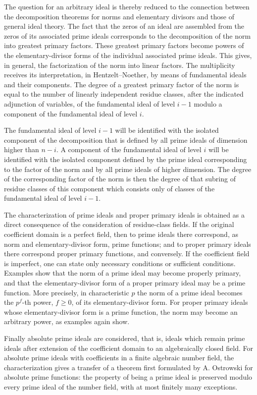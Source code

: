 \documentclass[11pt]{article}
\begin{document}
The question for an arbitrary ideal is thereby reduced to the connection between the decomposition theorems for norms and elementary divisors and those of general ideal theory. The fact that the zeros of an ideal are assembled from the zeros of its associated prime ideals corresponds to the decomposition of the norm into greatest primary factors. These greatest primary factors become powers of the elementary-divisor forms of the individual associated prime ideals. This gives, in general, the factorization of the norm into linear factors. The multiplicity receives its interpretation, in Hentzelt--Noether, by means of fundamental ideals and their components. The degree of a greatest primary factor of the norm is equal to the number of linearly independent residue classes, after the indicated adjunction of variables, of the fundamental ideal of level $i-1$ modulo a component of the fundamental ideal of level $i$.

The fundamental ideal of level $i-1$ will be identified with the isolated component of the decomposition that is defined by all prime ideals of dimension higher than $n-i$. A component of the fundamental ideal of level $i$ will be identified with the isolated component defined by the prime ideal corresponding to the factor of the norm and by all prime ideals of higher dimension. The degree of the corresponding factor of the norm is then the degree of that subring of residue classes of this component which consists only of classes of the fundamental ideal of level $i-1$.

The characterization of prime ideals and proper primary ideals is obtained as a direct consequence of the consideration of residue-class fields. If the original coefficient domain is a perfect field, then to prime ideals there correspond, as norm and elementary-divisor form, prime functions; and to proper primary ideals there correspond proper primary functions, and conversely. If the coefficient field is imperfect, one can state only necessary conditions or sufficient conditions. Examples show that the norm of a prime ideal may become properly primary, and that the elementary-divisor form of a proper primary ideal may be a prime function. More precisely, in characteristic $p$ the norm of a prime ideal becomes the $p^f$-th power, $f\geq 0$, of its elementary-divisor form. For proper primary ideals whose elementary-divisor form is a prime function, the norm may become an arbitrary power, as examples again show.

Finally absolute prime ideals are considered, that is, ideals which remain prime ideals after extension of the coefficient domain to an algebraically closed field. For absolute prime ideals with coefficients in a finite algebraic number field, the characterization gives a transfer of a theorem first formulated by A. Ostrowski for absolute prime functions: the property of being a prime ideal is preserved modulo every prime ideal of the number field, with at most finitely many exceptions.
\end{document}
